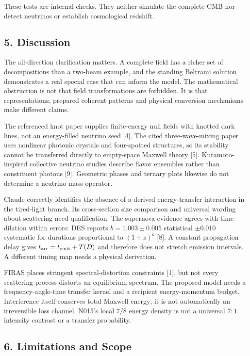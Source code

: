 \documentclass[
  11pt,
]{article}
\begin{document}
These tests are internal checks. They neither simulate the complete CMB
nor detect neutrinos or establish cosmological redshift.

\hypertarget{discussion}{%
\subsection{5. Discussion}\label{discussion}}

The all-direction clarification matters. A complete field has a richer
set of decompositions than a two-beam example, and the standing Beltrami
solution demonstrates a real special case that can inform the model. The
mathematical obstruction is not that field transformations are
forbidden. It is that representations, prepared coherent patterns and
physical conversion mechanisms make different claims.

The referenced knot paper supplies finite-energy null fields with
knotted dark lines, not an energy-filled neutrino seed {[}4{]}. The
cited three-wave-mixing paper uses nonlinear photonic crystals and
four-spotted structures, so its stability cannot be transferred directly
to empty-space Maxwell theory {[}5{]}. Kuramoto-inspired collective
neutrino studies describe flavor ensembles rather than constituent
photons {[}9{]}. Geometric phases and ternary plots likewise do not
determine a neutrino mass operator.

Claude correctly identifies the absence of a derived energy-transfer
interaction in the tired-light branch. Its cross-section size comparison
and universal wording about scattering need qualification. The supernova
evidence agrees with time dilation within errors: DES reports
\(b=1.003\pm0.005\) statistical \(\pm0.010\) systematic for durations
proportional to \((1+z)^b\) {[}8{]}. A constant propagation delay gives
\(t_{\rm arr}=t_{\rm emit}+T(D)\) and therefore does not stretch
emission intervals. A different timing map needs a physical derivation.

FIRAS places stringent spectral-distortion constraints {[}1{]}, but not
every scattering process distorts an equilibrium spectrum. The proposed
model needs a frequency-angle-time transfer kernel and a recipient
energy-momentum budget. Interference itself conserves total Maxwell
energy; it is not automatically an irreversible loss channel. N015's
local \(7/8\) energy density is not a universal \(7:1\) intensity
contrast or a transfer probability.

\hypertarget{limitations-and-scope}{%
\subsection{6. Limitations and Scope}\label{limitations-and-scope}}
\end{document}

